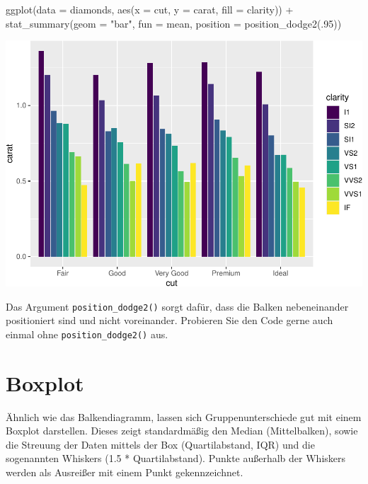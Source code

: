 \documentclass[
]{book}
\newenvironment{Shaded}{\begin{snugshade}}{\end{snugshade}}
\newcommand{\AttributeTok}[1]{\textcolor[rgb]{0.77,0.63,0.00}{#1}}
\newcommand{\DecValTok}[1]{\textcolor[rgb]{0.00,0.00,0.81}{#1}}
\newcommand{\FunctionTok}[1]{\textcolor[rgb]{0.00,0.00,0.00}{#1}}
\newcommand{\NormalTok}[1]{#1}
\newcommand{\SpecialCharTok}[1]{\textcolor[rgb]{0.00,0.00,0.00}{#1}}
\newcommand{\StringTok}[1]{\textcolor[rgb]{0.31,0.60,0.02}{#1}}
\begin{document}
\begin{Shaded}
\begin{Highlighting}[]
\FunctionTok{ggplot}\NormalTok{(}\AttributeTok{data =}\NormalTok{ diamonds, }\FunctionTok{aes}\NormalTok{(}\AttributeTok{x =}\NormalTok{ cut, }\AttributeTok{y =}\NormalTok{ carat, }\AttributeTok{fill =}\NormalTok{ clarity)) }\SpecialCharTok{+}
  \FunctionTok{stat\_summary}\NormalTok{(}\AttributeTok{geom =} \StringTok{"bar"}\NormalTok{, }\AttributeTok{fun =}\NormalTok{ mean, }\AttributeTok{position =} \FunctionTok{position\_dodge2}\NormalTok{(.}\DecValTok{95}\NormalTok{))}
\end{Highlighting}
\end{Shaded}

\includegraphics{CFH_R_bookdown_files/figure-latex/unnamed-chunk-168-1.pdf}

Das Argument \texttt{position\_dodge2()} sorgt dafür, dass die Balken nebeneinander positioniert sind und nicht voreinander. Probieren Sie den Code gerne auch einmal ohne \texttt{position\_dodge2()} aus.

\hypertarget{boxplot}{%
\section{Boxplot}\label{boxplot}}

Ähnlich wie das Balkendiagramm, lassen sich Gruppenunterschiede gut mit einem Boxplot darstellen. Dieses zeigt standardmäßig den Median (Mittelbalken), sowie die Streuung der Daten mittels der Box (Quartilabstand, IQR) und die sogenannten Whiskers (1.5 * Quartilabstand). Punkte außerhalb der Whiskers werden als Ausreißer mit einem Punkt gekennzeichnet.
\end{document}
